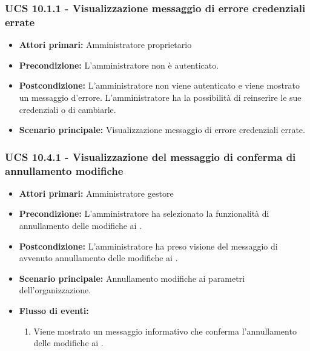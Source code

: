 \subsubsection{UCS 10.1.1 - Visualizzazione messaggio di errore credenziali errate}%
\begin{itemize}
\item \textbf{Attori primari:} Amministratore proprietario
\item \textbf{Precondizione:} L'amministratore non è autenticato.
\item \textbf{Postcondizione:} L'amministratore non viene autenticato e viene mostrato un messaggio d'errore. L'amministratore ha la possibilità di reinserire le sue credenziali o di cambiarle.
\item \textbf{Scenario principale:} Visualizzazione messaggio di errore credenziali errate.
\end{itemize}

\subsubsection{UCS 10.4.1 - Visualizzazione del messaggio di conferma di annullamento modifiche}%
\begin{itemize}
\item \textbf{Attori primari:} Amministratore gestore
\item \textbf{Precondizione:} L'amministratore ha selezionato la funzionalità di annullamento delle modifiche ai .
\item \textbf{Postcondizione:} L'amministratore ha preso visione del messaggio di avvenuto annullamento delle modifiche ai .
\item \textbf{Scenario principale:} Annullamento modifiche ai parametri dell'organizzazione.
\item \textbf{Flusso di eventi:}
    \begin{enumerate}
        \item Viene mostrato un messaggio informativo che conferma l'annullamento delle modifiche ai .
    \end{enumerate} 
\end{itemize}

